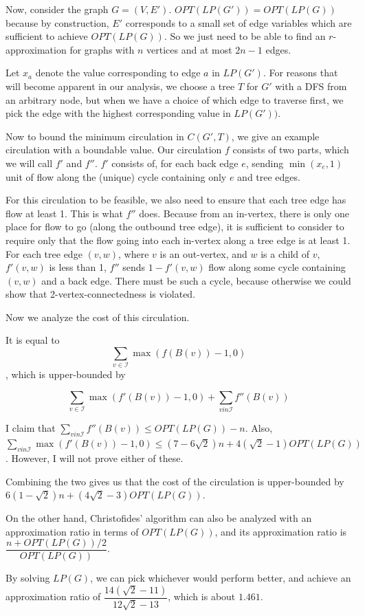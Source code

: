 \documentclass[12pt]{article}
\begin{document}
Now, consider the graph $G = (V, E')$.  $OPT(LP(G')) = OPT(LP(G))$ because by
construction, $E'$ corresponds to a small set of edge variables which are sufficient
to achieve $OPT(LP(G))$.  So we just need to be able to find an
$r$-approximation for graphs with $n$ vertices and at most $2n-1$ edges.

Let $x_a$ denote the value corresponding to edge $a$ in $LP(G')$.  For reasons that will
become apparent in our analysis, we choose a tree $T$ for $G'$ with a DFS from an
arbitrary node, but when we have a choice of which edge to traverse first, we
pick the edge with the highest corresponding value in $LP(G'))$.

Now to bound the minimum circulation in $C(G', T)$, we give an example
circulation with a boundable value.  Our circulation $f$ consists of two parts,
which we will call $f'$ and $f''$.  $f'$ consists of, for each back edge $e$,
sending $\min(x_e, 1)$ unit of flow along the (unique) cycle containing only $e$
and tree edges.

For this circulation to be feasible, we also need to ensure that each tree edge
has flow at least 1.  This is what $f''$ does.  Because from an in-vertex, there
is only one place for flow to go (along the outbound tree edge), it is
sufficient to consider to require only that the flow going into each in-vertex
along a tree edge is at least 1. For each tree edge $(v, w)$, where $v$ is an
out-vertex, and $w$ is a child of $v$, $f'(v,w)$ is less than 1, $f''$ sends $1
- f'(v,w)$ flow along some cycle containing $(v,w)$ and a back edge.  There must be
such a cycle, because otherwise we could show that 2-vertex-connectedness is
violated.

Now we analyze the cost of this circulation.

It is equal to 
\[
\sum_{v \in \mathcal{I}} \max(f(B(v))-1, 0)
\], which is upper-bounded by

\[
\sum_{v \in \mathcal{I}} \max(f'(B(v))-1,0) + \sum_{v in \mathcal{I}} f''(B(v))
\]

I claim that $\sum_{v in \mathcal{I}} f''(B(v)) \le OPT(LP(G)) - n$.
Also, $\sum_{v in \mathcal{I}} \max(f'(B(v)) - 1, 0) \le (7 - 6 \sqrt{2})n +
4(\sqrt{2} - 1)OPT(LP(G))$.  However, I will not prove either of these.

Combining the two gives us that the cost of the circulation is upper-bounded by
$6(1- \sqrt{2})n + (4\sqrt{2} - 3)OPT(LP(G))$.

On the other hand, Christofides' algorithm can also be analyzed with an
approximation ratio in terms of $OPT(LP(G))$, and its approximation ratio is
$\dfrac{n + OPT(LP(G))/2}{OPT(LP(G))}$.

By solving $LP(G)$, we can pick whichever would perform better, and achieve an
approximation ratio of $\dfrac{14(\sqrt{2} - 11)}{12\sqrt{2} - 13}$, which is
about $1.461$.



\end{document}

